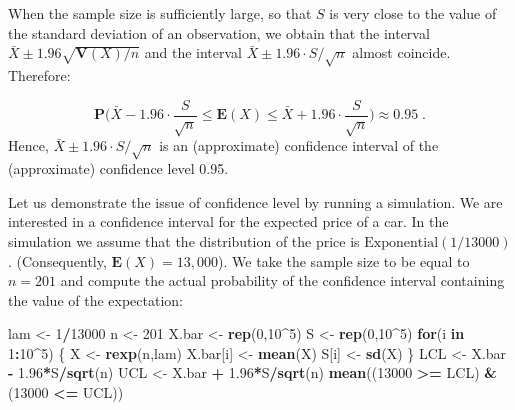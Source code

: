 \documentclass[
]{krantz}
\makeatletter
\newenvironment{Shaded}{\begin{snugshade}}{\end{snugshade}}
\newcommand{\ControlFlowTok}[1]{\textcolor[rgb]{0.13,0.29,0.53}{\textbf{#1}}}
\newcommand{\DecValTok}[1]{\textcolor[rgb]{0.00,0.00,0.81}{#1}}
\newcommand{\FloatTok}[1]{\textcolor[rgb]{0.00,0.00,0.81}{#1}}
\newcommand{\KeywordTok}[1]{\textcolor[rgb]{0.13,0.29,0.53}{\textbf{#1}}}
\newcommand{\NormalTok}[1]{#1}
\newcommand{\OperatorTok}[1]{\textcolor[rgb]{0.81,0.36,0.00}{\textbf{#1}}}
\newcommand{\StringTok}[1]{\textcolor[rgb]{0.31,0.60,0.02}{#1}}
\newcommand{\Expec}{\mathbf{E}}
\newcommand{\Prob}{\mathbf{P}}
\newcommand{\Var}{\mathbf{V}}
\newenvironment{kframe}{%
\medskip{}
\setlength{\fboxsep}{.8em}
 \def\at@end@of@kframe{}%
 \ifinner\ifhmode%
  \def\at@end@of@kframe{\end{minipage}}%
  \begin{minipage}{\columnwidth}%
 \fi\fi%
 \def\FrameCommand##1{\hskip\@totalleftmargin \hskip-\fboxsep
 \colorbox{shadecolor}{##1}\hskip-\fboxsep
     \hskip-\linewidth \hskip-\@totalleftmargin \hskip\columnwidth}%
 \MakeFramed {\advance\hsize-\width
   \@totalleftmargin\z@ \linewidth\hsize
   \@setminipage}}%
 {\par\unskip\endMakeFramed%
 \at@end@of@kframe}
\renewenvironment{Shaded}{\begin{kframe}}{\end{kframe}}
\theoremstyle{definition}
\theoremstyle{definition}
\theoremstyle{definition}
\theoremstyle{remark}
\makeatother
\begin{document}
When the sample size is sufficiently large, so that \(S\) is very close to
the value of the standard deviation of an observation, we obtain that
the interval \(\bar X \pm 1.96 \sqrt{\Var(X)/n}\) and the interval
\(\bar X \pm 1.96 \cdot S/\sqrt{n}\) almost coincide. Therefore:

\[\Prob \bigg( \bar X -1.96 \cdot \frac{S}{\sqrt{n}} \leq  \Expec(X) \leq \bar X + 1.96 \cdot \frac{S}{\sqrt{n}}\bigg) \approx 0.95\;.\]
Hence, \(\bar X \pm 1.96 \cdot S/\sqrt{n}\) is an (approximate) confidence
interval of the (approximate) confidence level 0.95.

Let us demonstrate the issue of confidence level by running a
simulation. We are interested in a confidence interval for the expected
price of a car. In the simulation we assume that the distribution of the
price is \(\mathrm{Exponential}(1/13000)\). (Consequently,
\(\Expec(X) = 13,000\)). We take the sample size to be equal to \(n=201\)
and compute the actual probability of the confidence interval containing
the value of the expectation:

\begin{Shaded}
\begin{Highlighting}[]
\NormalTok{lam <-}\StringTok{ }\DecValTok{1}\OperatorTok{/}\DecValTok{13000}
\NormalTok{n <-}\StringTok{ }\DecValTok{201}
\NormalTok{X.bar <-}\StringTok{ }\KeywordTok{rep}\NormalTok{(}\DecValTok{0}\NormalTok{,}\DecValTok{10}\OperatorTok{^}\DecValTok{5}\NormalTok{)}
\NormalTok{S <-}\StringTok{ }\KeywordTok{rep}\NormalTok{(}\DecValTok{0}\NormalTok{,}\DecValTok{10}\OperatorTok{^}\DecValTok{5}\NormalTok{)}
\ControlFlowTok{for}\NormalTok{(i }\ControlFlowTok{in} \DecValTok{1}\OperatorTok{:}\DecValTok{10}\OperatorTok{^}\DecValTok{5}\NormalTok{) \{}
\NormalTok{  X <-}\StringTok{ }\KeywordTok{rexp}\NormalTok{(n,lam)}
\NormalTok{  X.bar[i] <-}\StringTok{ }\KeywordTok{mean}\NormalTok{(X)}
\NormalTok{  S[i] <-}\StringTok{ }\KeywordTok{sd}\NormalTok{(X)}
\NormalTok{\}}
\NormalTok{LCL <-}\StringTok{ }\NormalTok{X.bar }\OperatorTok{-}\StringTok{ }\FloatTok{1.96}\OperatorTok{*}\NormalTok{S}\OperatorTok{/}\KeywordTok{sqrt}\NormalTok{(n)}
\NormalTok{UCL <-}\StringTok{ }\NormalTok{X.bar }\OperatorTok{+}\StringTok{ }\FloatTok{1.96}\OperatorTok{*}\NormalTok{S}\OperatorTok{/}\KeywordTok{sqrt}\NormalTok{(n)}
\KeywordTok{mean}\NormalTok{((}\DecValTok{13000} \OperatorTok{>=}\StringTok{ }\NormalTok{LCL) }\OperatorTok{&}\StringTok{ }\NormalTok{(}\DecValTok{13000} \OperatorTok{<=}\StringTok{ }\NormalTok{UCL))}
\end{Highlighting}
\end{Shaded}
\end{document}
